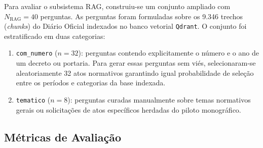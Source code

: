 \documentclass[12pt]{article}
\begin{document}
\begin{table}[htbp]
\centering
\caption{Exemplos representativos de consultas do conjunto de referência}
\label{tab:exemplos}
\end{table}

Para avaliar o subsistema RAG, construiu-se um conjunto ampliado com $N_{\text{RAG}} = 40$ perguntas. As perguntas foram formuladas sobre os 9.346 trechos (\textit{chunks}) do Diário Oficial indexados no banco vetorial \texttt{Qdrant}. O conjunto foi estratificado em duas categorias:
\begin{enumerate}
    \item \texttt{com\_numero} ($n = 32$): perguntas contendo explicitamente o número e o ano de um decreto ou portaria. Para gerar essas perguntas sem viés, selecionaram-se aleatoriamente 32 atos normativos garantindo igual probabilidade de seleção entre os períodos e categorias da base indexada.
    \item \texttt{tematico} ($n = 8$): perguntas curadas manualmente sobre temas normativos gerais ou solicitações de atos específicos herdadas do piloto monográfico.
\end{enumerate}

\subsection{Métricas de Avaliação}
\end{document}

